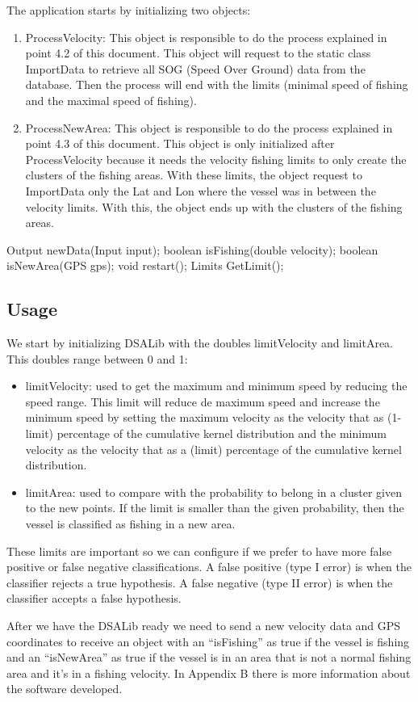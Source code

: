 The application starts by initializing two objects:
\begin{enumerate}
\item    ProcessVelocity: This object is responsible to do the process explained in point 4.2 of this document. This object will request to the static class ImportData to retrieve all SOG (Speed Over Ground) data from the database. Then the process will end with the limits (minimal speed of fishing and the maximal speed of fishing).
\item    ProcessNewArea: This object is responsible to do the process explained in point 4.3 of this document. This object is only initialized after ProcessVelocity because it needs the velocity fishing limits to only create the clusters of the fishing areas. With these limits, the object request to ImportData only the Lat and Lon where the vessel was in between the velocity limits. With this, the object ends up with the clusters of the fishing areas.
\end{enumerate}


Output newData(Input input);
boolean isFishing(double velocity);
boolean isNewArea(GPS gps);
void restart();
Limits GetLimit(); 

\subsection{Usage} %
\label{sub:usage}
We start by initializing DSALib with the doubles limitVelocity and limitArea. This doubles range between 0 and 1:
\begin{itemize}
\item limitVelocity: used to get the maximum and minimum speed by reducing the speed range. This limit will reduce de maximum speed and increase the minimum speed by setting the maximum velocity as the velocity that as (1-limit) percentage of the cumulative kernel distribution and the minimum velocity as the velocity that as a (limit) percentage of the cumulative kernel distribution.
\item limitArea: used to compare with the probability to belong in a cluster given to the new points. If the limit is smaller than the given probability, then the vessel is classified as fishing in a new area.
\end{itemize}
These limits are important so we can configure if we prefer to have more false positive or false negative classifications.
A false positive (type I error) is when the classifier rejects a true hypothesis.
A false negative (type II error) is when the classifier accepts a false hypothesis.

After we have the DSALib ready we need to send a new velocity data and GPS coordinates to receive an object with an “isFishing” as true if the vessel is fishing and an “isNewArea” as true if the vessel is in an area that is not a normal fishing area and it’s in a fishing velocity. In Appendix B there is more information about the software developed.






